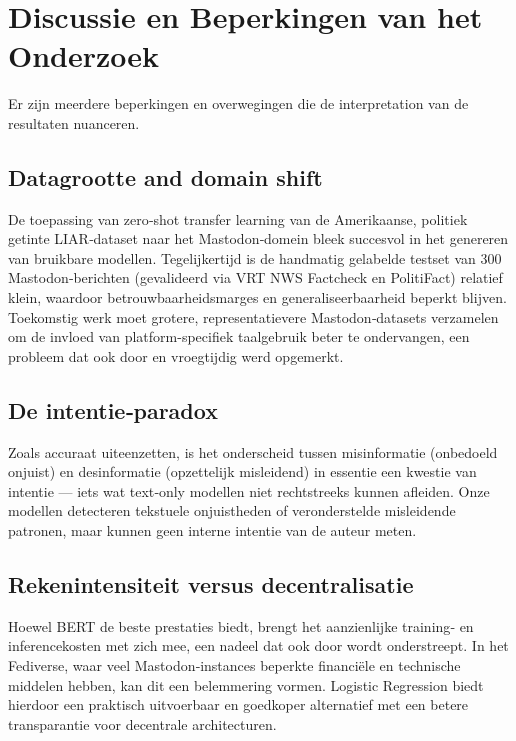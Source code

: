 \section{Discussie en Beperkingen van het Onderzoek}
Er zijn meerdere beperkingen en overwegingen die de interpretation van de resultaten nuanceren.

\subsection{Datagrootte and domain shift}
De toepassing van zero‑shot transfer learning van de Amerikaanse, politiek getinte LIAR‑dataset naar het Mastodon‑domein bleek succesvol in het genereren van bruikbare modellen. Tegelijkertijd is de handmatig gelabelde testset van 300 Mastodon‑berichten (gevalideerd via VRT NWS Factcheck en PolitiFact) relatief klein, waardoor betrouwbaarheidsmarges en generaliseerbaarheid beperkt blijven. Toekomstig werk moet grotere, representatievere Mastodon‑datasets verzamelen om de invloed van platform-specifiek taalgebruik beter te ondervangen, een probleem dat ook door \textcite{castillo2011information} en \textcite{perez2018automatic} vroegtijdig werd opgemerkt.

\subsection{De intentie‑paradox}
Zoals \textcite{wardle2017information} accuraat uiteenzetten, is het onderscheid tussen misinformatie (onbedoeld onjuist) en desinformatie (opzettelijk misleidend) in essentie een kwestie van intentie — iets wat text‑only modellen niet rechtstreeks kunnen afleiden. Onze modellen detecteren tekstuele onjuistheden of veronderstelde misleidende patronen, maar kunnen geen interne intentie van de auteur meten.

\subsection{Rekenintensiteit versus decentralisatie}
Hoewel BERT de beste prestaties biedt, brengt het aanzienlijke training‑ en inferencekosten met zich mee, een nadeel dat ook door \textcite{Khatri2025} wordt onderstreept. In het Fediverse, waar veel Mastodon‑instances beperkte financiële en technische middelen hebben, kan dit een belemmering vormen. Logistic Regression biedt hierdoor een praktisch uitvoerbaar en goedkoper alternatief met een betere transparantie voor decentrale architecturen.

